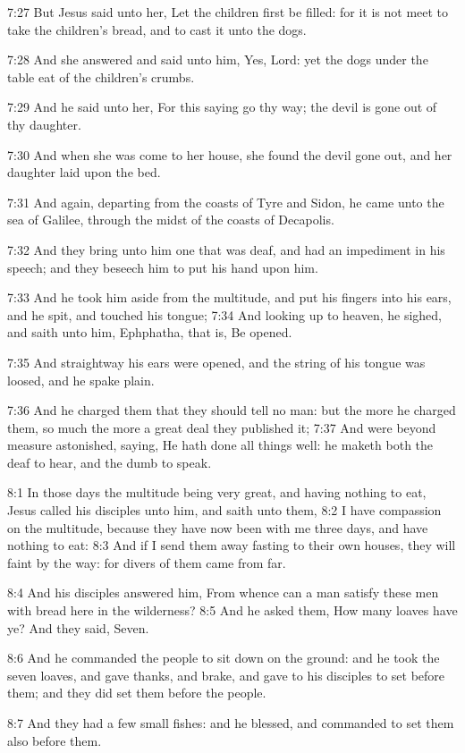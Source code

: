 7:27 But Jesus said unto her, Let the children first be filled: for it is not meet to take the children's bread, and to cast it unto the dogs.

7:28 And she answered and said unto him, Yes, Lord: yet the dogs under the table eat of the children's crumbs.

7:29 And he said unto her, For this saying go thy way; the devil is gone out of thy daughter.

7:30 And when she was come to her house, she found the devil gone out, and her daughter laid upon the bed.

7:31 And again, departing from the coasts of Tyre and Sidon, he came unto the sea of Galilee, through the midst of the coasts of Decapolis.

7:32 And they bring unto him one that was deaf, and had an impediment in his speech; and they beseech him to put his hand upon him.

7:33 And he took him aside from the multitude, and put his fingers into his ears, and he spit, and touched his tongue; 7:34 And looking up to heaven, he sighed, and saith unto him, Ephphatha, that is, Be opened.

7:35 And straightway his ears were opened, and the string of his tongue was loosed, and he spake plain.

7:36 And he charged them that they should tell no man: but the more he charged them, so much the more a great deal they published it; 7:37 And were beyond measure astonished, saying, He hath done all things well: he maketh both the deaf to hear, and the dumb to speak.

8:1 In those days the multitude being very great, and having nothing to eat, Jesus called his disciples unto him, and saith unto them, 8:2 I have compassion on the multitude, because they have now been with me three days, and have nothing to eat: 8:3 And if I send them away fasting to their own houses, they will faint by the way: for divers of them came from far.

8:4 And his disciples answered him, From whence can a man satisfy these men with bread here in the wilderness?  8:5 And he asked them, How many loaves have ye? And they said, Seven.

8:6 And he commanded the people to sit down on the ground: and he took the seven loaves, and gave thanks, and brake, and gave to his disciples to set before them; and they did set them before the people.

8:7 And they had a few small fishes: and he blessed, and commanded to set them also before them.

